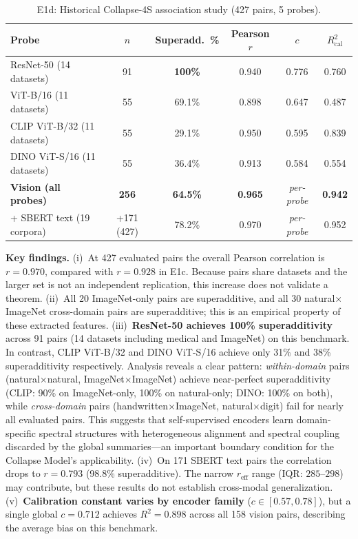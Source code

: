 \documentclass{article}
\newcommand{\reff}{\ensuremath{r_{\mathrm{eff}}}\xspace}
\begin{document}
\begin{table}[h]
\centering
\caption{E1d: Historical Collapse-4S association study (427 pairs, 5 probes).}
\small
\setlength{\tabcolsep}{3.5pt}
\begin{tabular}{lccccc}
\toprule
Probe & $n$ & Superadd.\  \% & Pearson $r$ & $c$ & $R^2_{\mathrm{cal}}$ \\
\midrule
ResNet-50 (14 datasets)       & 91  & \textbf{100\%}   & 0.940 & 0.776 & 0.760 \\
ViT-B/16 (11 datasets)        & 55  & 69.1\%            & 0.898 & 0.647 & 0.487 \\
CLIP ViT-B/32 (11 datasets)    & 55  & 29.1\%            & 0.950 & 0.595 & 0.839 \\
DINO ViT-S/16 (11 datasets)    & 55  & 36.4\%            & 0.913 & 0.584 & 0.554 \\
\midrule
\textbf{Vision (all probes)}   & \textbf{256} & \textbf{64.5\%} & \textbf{0.965} & \emph{per-probe} & \textbf{0.942} \\
+ SBERT text (19 corpora)      & +171 (427)   & 78.2\%           & 0.970          & \emph{per-probe} & 0.952 \\
\bottomrule
\end{tabular}\normalsize
\end{table}

\textbf{Key findings.}
(i)~At 427 evaluated pairs the overall Pearson correlation is $r{=}0.970$,
compared with $r{=}0.928$ in E1c.  Because pairs share datasets and the larger
set is not an independent replication, this increase does not validate a theorem.
(ii)~All 20 ImageNet-only pairs
are superadditive, and all 30 natural$\times$ImageNet cross-domain pairs
are superadditive; this is an empirical property of these extracted features.
(iii)~\textbf{ResNet-50 achieves 100\% superadditivity} across 91 pairs
(14 datasets including medical and ImageNet) on this benchmark.
In contrast, CLIP ViT-B/32 and DINO ViT-S/16 achieve only 31\% and 38\%
superadditivity respectively.
Analysis reveals a clear pattern: \emph{within-domain} pairs
(natural$\times$natural, ImageNet$\times$ImageNet) achieve near-perfect
superadditivity (CLIP: 90\% on ImageNet-only, 100\% on natural-only;
DINO: 100\% on both), while \emph{cross-domain} pairs
(handwritten$\times$ImageNet, natural$\times$digit) fail for nearly all
evaluated pairs.
This suggests that self-supervised encoders learn domain-specific spectral
structures with heterogeneous alignment and spectral coupling discarded by
the global summaries---an important boundary condition
for the Collapse Model's applicability.
(iv)~On 171 SBERT text pairs the correlation drops to $r{=}0.793$
(98.8\% superadditive).  The narrow $\reff$ range (IQR: $285$--$298$) may
contribute, but these results do not establish cross-modal generalization.
(v)~\textbf{Calibration constant varies by encoder family} ($c{\in}[0.57, 0.78]$),
but a single global $c{=}0.712$ achieves $R^2{=}0.898$ across all 158 vision pairs,
describing the average bias on this benchmark.
\end{document}
